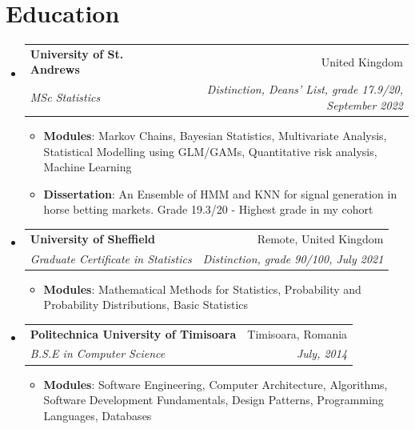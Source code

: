 \documentclass[letterpaper,11pt]{article}
\makeatletter
\newcommand{\resumeItem}[2]{
  \item\small{
    \textbf{#1}{: #2 \vspace{-2pt}}
  }
}
\newcommand{\resumeSubheading}[4]{
  \vspace{-2pt}\item
    \begin{tabular*}{0.97\textwidth}{l@{\extracolsep{\fill}}r}
      \textbf{#1} & #2 \\
      \textit{\small#3} & \textit{\small #4} \\
    \end{tabular*}\vspace{-6pt}
}
\newcommand{\resumeSubHeadingListStart}{\begin{itemize}[leftmargin=*]}
\newcommand{\resumeSubHeadingListEnd}{\end{itemize}}
\newcommand{\resumeItemListStart}{\begin{itemize}}
\newcommand{\resumeItemListEnd}{\end{itemize}\vspace{-6pt}}
\makeatother
\begin{document}
\section{Education}
  \resumeSubHeadingListStart
    \resumeSubheading
      {University of St. Andrews}{United Kingdom}
      {MSc Statistics} {Distinction, Deans' List, grade 17.9/20, September 2022}
    \resumeItemListStart
    	\resumeItem{Modules}
        {Markov Chains, Bayesian Statistics, Multivariate Analysis, Statistical Modelling using GLM/GAMs, Quantitative risk analysis, Machine Learning}
      \resumeItem{Dissertation}
        {An Ensemble of HMM and KNN for signal generation in horse betting markets. Grade 19.3/20 - Highest grade in my cohort}
    \resumeItemListEnd
    \resumeSubheading
      {University of Sheffield}{Remote, United Kingdom}
      {Graduate Certificate in Statistics}{Distinction, grade 90/100, July 2021}
    \resumeItemListStart
    	\resumeItem{Modules}
        {Mathematical Methods for Statistics, Probability and Probability Distributions, Basic Statistics}
    \resumeItemListEnd
    \resumeSubheading
      {Politechnica University of Timisoara}{Timisoara, Romania}
      {B.S.E in Computer Science}{July, 2014}
    \resumeItemListStart
    	\resumeItem{Modules}
        {Software Engineering, Computer Architecture, Algorithms, Software Development Fundamentals, Design Patterns, Programming Languages, Databases}
    \resumeItemListEnd
  \resumeSubHeadingListEnd

\end{document}
